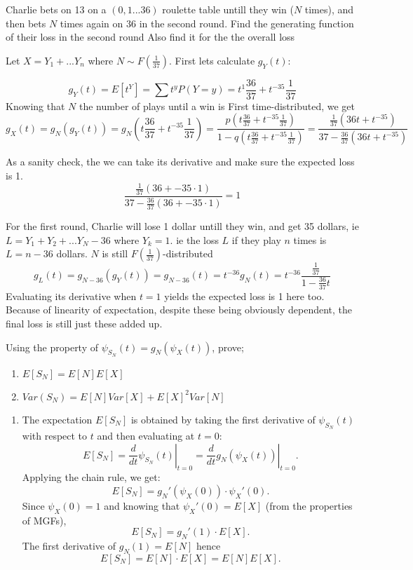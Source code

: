 \begin{enumerate}[label=(\alph*)]
\exercise
Charlie bets on 13 on a $(0,1...36)$ roulette table untill they win ($N$ times), and then bets $N$ times again on 36 in the second round. Find the generating function of their loss in the second round
Also find it for the the overall loss

\solution
Let \(X = Y_1 + ... Y_n\) where $N \sim F(\frac{1}{37})$. First lets calculate $g_Y(t)$:


\[
    g_Y(t) = E[t^Y] = \sum t^y P(Y=y) = t^1 \frac{36}{37} + t^{-35} \frac{1}{37}
\]
Knowing that $N$ the number of plays until a win is First time-distributed, we get
\[
    g_X(t) = g_N(g_Y(t)) = g_N(t \frac{36}{37} + t^{-35} \frac{1}{37}) = \frac{p(t \frac{36}{37} + t^{-35} \frac{1}{37})}{1-q(t \frac{36}{37} + t^{-35} \frac{1}{37})} = \frac{\frac{1}{37}(36t + t^{-35} )}{37-\frac{36}{37}(36t + t^{-35} )}
     \]

As a sanity check, the we can take its derivative and make sure the expected loss is 1.
\[ 
    \frac{\frac{1}{37}(36 + -35 \cdot 1 )}{37-\frac{36}{37}(36 + -35 \cdot 1)} = 1
\]

For the first round, Charlie will lose 1 dollar untill they win, and get 35 dollars, ie $L = Y_1 + Y_2 +... Y_N -36$ where $Y_k = 1$. ie the loss $L$ if they play $n$ times is $L = n-36$ dollars. $N$ is still $F(\frac{1}{37})$-distributed
\[
    g_L(t) = g_{N-36}(g_Y(t)) = g_{N-36}(t) = t^{-36}g_N(t) = t^{-36} \frac{\frac{1}{37}}{1 -\frac{36}{37}t}
\]
Evaluating its derivative when $t=1$ yields the expected loss is 1 here too. Because of linearity of expectation, despite these being obviously dependent, the final loss is still just these added up.
\vspace*{100pt}

\exercise
Using the property of \(\psi_{S_N}(t) = g_N(\psi_{X}(t))\), prove;

\begin{enumerate}
    \item \(E[S_N] = E[N]E[X]\)
    \item \(Var(S_N) = E[N]Var[X] + E[X]^2Var[N]\)
\end{enumerate}

\solution

\begin{enumerate}
    \item The expectation $E[S_N]$ is obtained by taking the first derivative of $\psi_{S_N}(t)$ with respect to $t$ and then evaluating at $t=0$:
    \[
    E[S_N] = \left.\frac{d}{dt}\psi_{S_N}(t)\right|_{t=0} = \left.\frac{d}{dt} g_N(\psi_X(t))\right|_{t=0}.
    \]
    Applying the chain rule, we get:
    \[
    E[S_N] = g_N'(\psi_X(0)) \cdot \psi_X'(0).
    \]
    Since $\psi_X(0) = 1$ and knowing that $\psi_X'(0) = E[X]$ (from the properties of MGFs),
    \[
    E[S_N] = g_N'(1) \cdot E[X].
    \]
    The first derivative of $g_N(1) = E[N]$  hence
    \[
    E[S_N] = E[N] \cdot E[X] = E[N]E[X].
    \]


\end{enumerate}
\end{enumerate}

